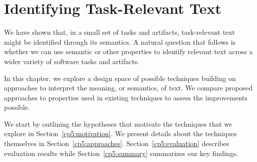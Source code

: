 \setcounter{chapter}{4}
\setcounter{rq}{1}


\chapter{Identifying Task-Relevant Text}
\label{ch:identifying}

We have  shown that, in a small set of tasks and artifacts, task-relevant text might be identified through its semantics.
A natural question that follows is whether we can use semantic or other properties to identify relevant text across a wider variety of software tasks and artifacts.

In this chapter, we explore a design space of possible techniques building on approaches to
interpret the meaning, or semantics, of text. We compare proposed approaches to properties
used in existing techniques to assess the improvements possible. 

We start by outlining the hypotheses that motivate the techniques that we explore in Section~\ref{cp5:motivation}.
We present details about the techniques themselves in Section~\ref{cp5:approaches}.
Section~\ref{cp5:evaluation} describes evaluation results while
Section~\ref{cp5:summary} summarizes our key findings.








